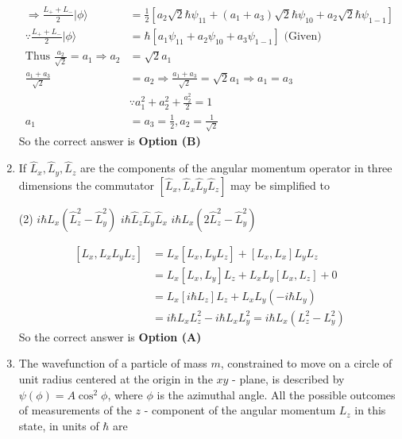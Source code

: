 \begin{enumerate}
\begin{answer}
\begin{align*}
\Rightarrow \frac{L_{+}+L_{-}}{2}|\phi\rangle&=\frac{1}{2}\left[a_{2} \sqrt{2} \hbar \psi_{11}+\left(a_{1}+a_{3}\right) \sqrt{2} \hbar \psi_{10}+a_{2} \sqrt{2} \hbar \psi_{1-1}\right]\\
\because \frac{L_{+}+L_{-}}{2}|\phi\rangle&=\hbar\left[a_{1} \psi_{11}+a_{2} \psi_{10}+a_{3} \psi_{1-1}\right]\text{ (Given)}\\\text{Thus }\frac{a_{2}}{\sqrt{2}}=a_{1} \Rightarrow a_{2}&=\sqrt{2} a_{1}\\
\frac{a_{1}+a_{3}}{\sqrt{2}}&=a_{2} \Rightarrow \frac{a_{1}+a_{3}}{\sqrt{2}}=\sqrt{2} a_{1} \Rightarrow a_{1}=a_{3} \\& \because a_{1}^{2}+a_{2}^{2}+\frac{a_{2}^{2}}{2}=1\\
a_{1}&=a_{3}=\frac{1}{2}, a_{2}=\frac{1}{\sqrt{2}}
\end{align*}
So the correct answer is \textbf{Option (B)}
\end{answer}
	\item If $\hat{L}_{x}, \hat{L}_{y}, \hat{L}_{z}$ are the components of the angular momentum operator in three dimensions the commutator $\left[\hat{L}_{x}, \hat{L}_{x} \hat{L}_{y} \hat{L}_{z}\right]$ may be simplified to
{	}
\begin{tasks}(2)
\task[\textbf{A.}] $i \hbar L_{x}\left(\hat{L}_{z}^{2}-\hat{L}_{y}^{2}\right)$
\task[\textbf{B.}] $i \hbar \hat{L}_{z} \hat{L}_{y} \hat{L}_{x}$
\task[\textbf{C.}] $i \hbar L_{x}\left(2 \hat{L}_{z}^{2}-\hat{L}_{y}^{2}\right)$
\end{tasks}
\begin{answer}
\begin{align*}
\left[L_{x}, L_{x} L_{y} L_{z}\right]&=L_{x}\left[L_{x}, L_{y} L_{z}\right]+\left[L_{x}, L_{x}\right] L_{y} L_{z}\\
&=L_{x}\left[L_{x}, L_{y}\right] L_{z}+L_{x} L_{y}\left[L_{x}, L_{z}\right]+0\\&=L_{x}\left[i \hbar L_{z}\right] L_{z}+L_{x} L_{y}\left(-i \hbar L_{y}\right)\\
&=i \hbar L_{x} L_{z}^{2}-i \hbar L_{x} L_{y}^{2}=i \hbar L_{x}\left(L_{z}^{2}-L_{y}^{2}\right)
\end{align*}
So the correct answer is \textbf{Option (A)}
\end{answer}
\item 	 The wavefunction of a particle of mass $m$, constrained to move on a circle of unit radius centered at the origin in the $x y$ - plane, is described by $\psi(\phi)=A \cos ^{2} \phi$, where $\phi$ is the azimuthal angle. All the possible outcomes of measurements of the $z$ - component of the angular momentum $L_{z}$ in this state, in units of $\hbar$ are

\end{enumerate}
